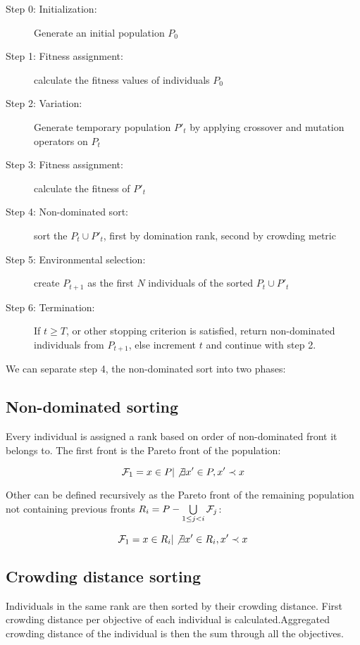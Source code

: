\documentclass[12pt,oneside]{fithesis2}
\begin{document}
\begin{description}
	\item[Step 0: Initialization:] Generate an initial population $P_0$ 
	\item[Step 1: Fitness assignment:] calculate the fitness values of individuals $P_0$
	\item[Step 2: Variation:] Generate temporary population $P'_t$ by applying crossover and mutation operators on $P_t$
	\item[Step 3: Fitness assignment:] calculate the fitness of $P'_t$
	\item[Step 4: Non-dominated sort:] sort the $P_t \cup P'_t$, first by domination rank, second by crowding metric
	\item[Step 5: Environmental selection:] create $P_{t+1}$ as the first $N$ individuals of the sorted $P_t \cup P'_t$
	\item[Step 6: Termination:] If $t \geq T$, or other stopping criterion is satisfied, return non-dominated individuals from $P_{t+1}$, else increment $t$ and continue with step 2.
\end{description}

We can separate step 4, the non-dominated sort into two phases:

\subsection{Non-dominated sorting}
Every individual is assigned a rank based on order of non-dominated front it belongs to. The first front is the Pareto front of the population:

$${\cal{F}}_1 = {x \in P | \not \exists x' \in P, x' \prec x} $$

Other can be defined recursively as the Pareto front of the remaining population not containing previous fronts $R_i = P - \bigcup\limits_{1\leq j < i} {\cal{F}}_j$:

$${\cal{F}}_1 = {x \in R_i | \not \exists x' \in R_i, x' \prec x} $$

\subsection{Crowding distance sorting}

Individuals in the same rank are then sorted by their crowding distance. First crowding distance per objective of each individual is calculated.Aggregated crowding distance of the individual is then the sum through all the objectives.
\end{document}
